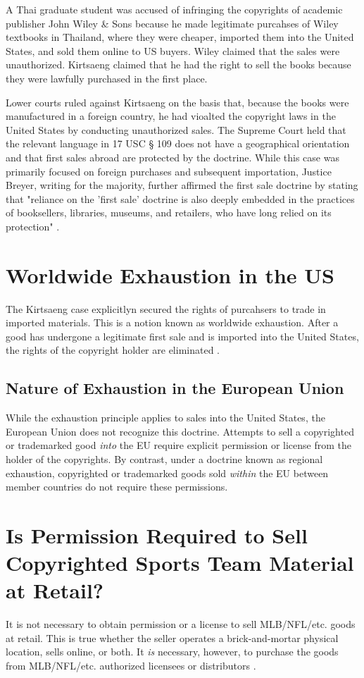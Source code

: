 \documentclass[letterpaper,11pt]{texMemo}
\begin{document}
    A Thai graduate student was accused of infringing the copyrights of academic publisher John Wiley \& Sons because he made legitimate purcahses of Wiley textbooks in Thailand, where they were cheaper, imported them into the United States, and sold them online to US buyers. Wiley claimed that the sales were unauthorized. Kirtsaeng claimed that he had the right to sell the books because they were lawfully purchased in the first place.

    Lower courts ruled against Kirtsaeng on the basis that, because the books were manufactured in a foreign country, he had vioalted the copyright laws in the United States by conducting unauthorized sales. The Supreme Court held that the relevant language in 17 USC § 109 does not have a geographical orientation and that first sales abroad are protected by the doctrine. While this case was primarily focused on foreign purchases and subsequent importation, Justice Breyer, writing for the majority, further affirmed the first sale doctrine by stating that "reliance on the 'first sale' doctrine is also deeply embedded in the practices of booksellers, libraries, museums, and retailers, who have long relied on its protection" \cite{kirtsaeng2016}.

  \section*{Worldwide Exhaustion in the US}
    The Kirtsaeng case explicitlyn secured the rights of purcahsers to trade in imported materials. This is a notion known as worldwide exhaustion. After a good has undergone a legitimate first sale and is imported into the United States, the rights of the copyright holder are eliminated \cite{ownersrights}.

    \subsection*{Nature of Exhaustion in the European Union}
      While the exhaustion principle applies to sales into the United States, the European Union does not recognize this doctrine. Attempts to sell a copyrighted or trademarked good \emph{into} the EU require explicit permission or license from the holder of the copyrights. By contrast, under a doctrine known as regional exhaustion, copyrighted or trademarked goods sold \emph{within} the EU between member countries do not require these permissions.

\section*{Is Permission Required to Sell Copyrighted Sports Team Material at Retail?}
  It is not necessary to obtain permission or a license to sell MLB/NFL/etc. goods at retail. This is true whether the seller operates a brick-and-mortar physical location, sells online, or both. It \emph{is} necessary, however, to purchase the goods from MLB/NFL/etc. authorized licensees or distributors \cite{licensedsports}.
\end{document}
